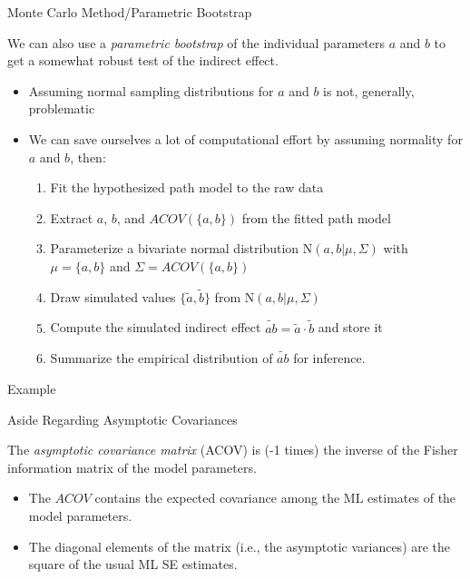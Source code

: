 \documentclass{beamer}
\newcommand{\va}[0]{\vspace{12pt}}
\newcommand{\vb}[0]{\vspace{6pt}}
\begin{document}
\begin{frame}[shrink = 5]{Monte Carlo Method/Parametric Bootstrap}
  
  We can also use a \emph{parametric bootstrap} of the individual
  parameters $a$ and $b$ to get a somewhat robust test of the indirect
  effect.  
  \vb
  \begin{itemize}
  \item Assuming normal sampling distributions for $a$ and $b$ is
    not, generally, problematic
    \vb
  \item We can save ourselves a lot of computational effort by
    assuming normality for $a$ and $b$, then:
    \vb
    \begin{enumerate}
    \item Fit the hypothesized path model to the raw data
      \vb
    \item Extract $a$, $b$, and $\textit{ACOV}(\{a, b\})$ from the fitted
      path model 
      \vb
    \item Parameterize a bivariate normal distribution $\text{N}(a, b
      |\mu, \Sigma)$ with $\mu = \{a, b\}$ and $\Sigma =
      \textit{ACOV}(\{a, b\})$ 
      \vb
    \item Draw simulated values $\{\tilde{a}, \tilde{b}\}$ from
      $\text{N}(a, b | \mu, \Sigma)$ 
      \vb
    \item Compute the simulated indirect effect
      $\widetilde{ab} = \tilde{a} \cdot \tilde{b}$ and store it
      \vb
    \item Summarize the empirical distribution of $\widetilde{ab}$
      for inference.
    \end{enumerate}
  \end{itemize}
  
\end{frame}



\begin{frame}[allowframebreaks]{Example}
  


\end{frame}


\begin{frame}[allowframebreaks]{Aside Regarding Asymptotic Covariances}

  The \emph{asymptotic covariance matrix} (ACOV) is (-1 times) the
  inverse of the Fisher information matrix of the model parameters.
  \vb  
  \begin{itemize}
  \item The $ACOV$ contains the expected covariance among the ML
    estimates of the model parameters.
    \vb
  \item The diagonal elements of the matrix (i.e., the asymptotic
    variances) are the square of the usual ML SE estimates.
  \end{itemize}
  \va


\end{frame}
\end{document}
